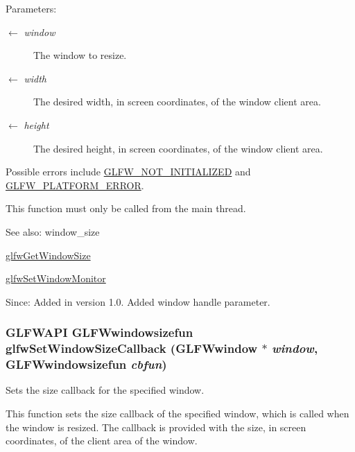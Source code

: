 \begin{Desc}
\item[Parameters:]
\begin{description}
\item[\mbox{$\leftarrow$} {\em window}]The window to resize. \item[\mbox{$\leftarrow$} {\em width}]The desired width, in screen coordinates, of the window client area. \item[\mbox{$\leftarrow$} {\em height}]The desired height, in screen coordinates, of the window client area.\end{description}
\end{Desc}
Possible errors include \hyperlink{group__errors_g2374ee02c177f12e1fa76ff3ed15e14a}{GLFW\_\-NOT\_\-INITIALIZED} and \hyperlink{group__errors_gd44162d78100ea5e87cdd38426b8c7a1}{GLFW\_\-PLATFORM\_\-ERROR}.

This function must only be called from the main thread.

\begin{Desc}
\item[See also:]window\_\-size 

\hyperlink{group__window_g7feb769ebb3f3d21579b5a3fb07be76e}{glfwGetWindowSize} 

\hyperlink{group__window_g12fabf78575e59c00f822f323ae0b6ae}{glfwSetWindowMonitor}\end{Desc}
\begin{Desc}
\item[Since:]Added in version 1.0.  Added window handle parameter. \end{Desc}
\hypertarget{group__window_g150dad5f364425916c5816074cffa5e7}{
\subsubsection[glfwSetWindowSizeCallback]{\setlength{\rightskip}{0pt plus 5cm}GLFWAPI {\bf GLFWwindowsizefun} glfwSetWindowSizeCallback ({\bf GLFWwindow} $\ast$ {\em window}, \/  {\bf GLFWwindowsizefun} {\em cbfun})}}
\label{group__window_g150dad5f364425916c5816074cffa5e7}


Sets the size callback for the specified window. 

This function sets the size callback of the specified window, which is called when the window is resized. The callback is provided with the size, in screen coordinates, of the client area of the window.

